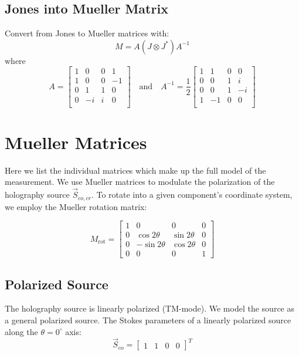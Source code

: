 \subsection{Jones into Mueller Matrix}
Convert from Jones to Mueller matrices with:
\begin{equation}
    M = A(J\otimes J^*)A^{-1}
\end{equation}
where
\begin{equation}
    A = \begin{bmatrix}
    1 & 0 & 0 & 1\\
    1 & 0 & 0 & -1\\
    0 & 1 & 1 & 0\\
    0 & -i & i & 0\\
  \end{bmatrix}\quad\text{and}\quad 
     A^{-1} = \frac{1}{2}\begin{bmatrix}
    1 & 1 & 0 & 0\\
    0 & 0 & 1 & i\\
    0 & 0 & 1 & -i\\
    1 & -1 & 0 & 0\\
  \end{bmatrix}
\end{equation}



\section{Mueller Matrices}

Here we list the individual matrices which make up the full model of the measurement.  We use Mueller matrices to modulate the polarization of the holography source $\vec{S}_{co,cr}$.  To rotate into a given component's coordinate system, we employ the Mueller rotation matrix:

\begin{equation}
   M_{\text{rot}}= \begin{bmatrix}
    1 & 0 & 0 & 0 \\
    0 & \cos{2\theta} & \sin{2\theta} & 0 \\
    0 & -\sin{2\theta} & \cos{2\theta} & 0  \\
    0 & 0 & 0 & 1
    \end{bmatrix}
\end{equation}

\subsection{Polarized Source}
The holography source is linearly polarized (TM-mode).  We model the source as a general polarized source.  The Stokes parameters of a linearly polarized source along the $\theta=0^\circ$ axis:
\begin{equation}\vec{S}_{co} = 
    \begin{bmatrix}
    1 & 1 & 0 & 0
    \end{bmatrix}^T
\end{equation}
    

